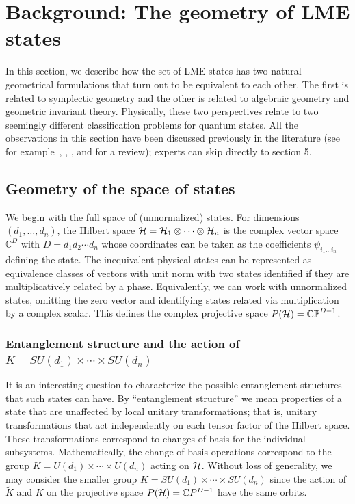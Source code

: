 \documentclass[12pt]{article}
\theoremstyle{definition}
\begin{document}
\section{Background: The geometry of LME states}

In this section, we describe how the set of LME states has two natural geometrical formulations that turn out to be equivalent to each other. The first is related to symplectic geometry and the other is related to algebraic geometry and geometric invariant theory. Physically, these two perspectives relate to two seemingly different classification problems for quantum states. All the observations in this section have been discussed previously in the literature (see for example~\cite{Kly02}, \cite[\S~3]{Kly07}, \cite[\S~4]{wallach}, and \cite{Walter} for a review); experts can skip directly to section 5.

\subsection{Geometry of the space of states}

We begin with the full space of (unnormalized) states. For dimensions $(d_1,\dots, d_n)$, the Hilbert space ${\cal H} = {\cal H}_1  \otimes \cdots  \otimes {\cal H}_n$ is the complex vector space  $\mathbb{C}^{D}$ with $D = d_1 d_2 \cdots d_n$ whose coordinates can be taken as the coefficients $\psi_{i_1 \dots i_n}$ defining the state. The inequivalent physical states can be represented as equivalence classes of vectors with unit norm with two states identified if they are multiplicatively related by a phase. Equivalently, we can work with unnormalized states, omitting the zero vector and identifying states related via multiplication by a complex scalar. This defines the complex projective space $P({\cal H}) = \mathbb{C P}^{D-1}$.

\subsubsection{Entanglement structure and the action of $K = SU(d_1) \times \cdots \times SU(d_n)$}

It is an interesting question to characterize the possible
entanglement structures that such states can have. By ``entanglement
structure'' we mean properties of a state that are unaffected by local
unitary transformations; that is, unitary transformations that act
independently on each tensor factor of the Hilbert space. These
transformations correspond to changes of basis for the individual
subsystems. Mathematically, the change of basis operations correspond
to the group $\tilde{K} = U(d_1) \times \cdots \times U(d_n)$ acting
on ${\cal H}$. Without loss of generality, we may consider the smaller
group $K = SU(d_{1})\times \dotsb \times SU(d_{n})$ since the action
of $\tilde{K}$ and $K$ on the projective space $P({\cal H}) = \mathbb{C}
P^{D-1}$ have the same orbits.
\end{document}
